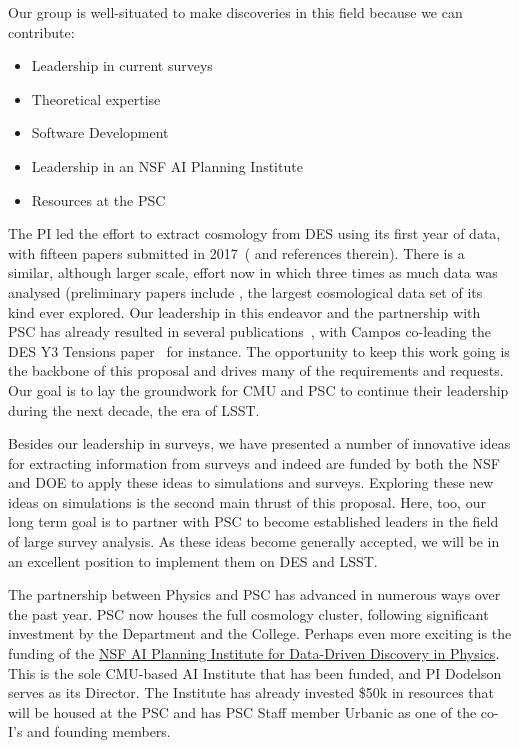 \documentclass[12pt]{article}
\begin{document}
\begin{small}
Our group is well-situated to make discoveries in this field because we can contribute:
\begin{itemize}
\item Leadership in current surveys
\item Theoretical expertise
\item Software Development
\item Leadership in an NSF AI Planning Institute
\item Resources at the PSC
\end{itemize} 
The PI led the effort to extract cosmology from DES using its first year of data, with fifteen papers submitted in 2017~(\cite{Abbott:2017wau} and references therein). There is a similar, although larger scale, effort now in which three times as much data was analysed (preliminary papers include , the largest cosmological data set of its kind ever explored. Our leadership in this endeavor and the partnership with PSC has already resulted in several publications~\cite{Hartley:2020euq,Lemos:2020jry,MacCrann:2020yhw,Friedrich:2020dqo,Myles:2020dyq}, with Campos co-leading the DES Y3 Tensions paper~\cite{y3-tensions} for instance. The opportunity to keep this work going is the backbone of this proposal and drives many of the requirements and requests. %
Our goal is to lay the groundwork for CMU and PSC to continue their leadership during the next decade, the era of LSST.

Besides our leadership in surveys, we have presented a number of innovative ideas for extracting information from surveys and indeed are funded by both the NSF and DOE to apply these ideas to simulations and surveys. Exploring these new ideas on simulations is the second main thrust of this proposal. Here, too, our long term goal is to partner with PSC to become established leaders in the field of large survey analysis. As these ideas become generally accepted, we will be in an excellent position to implement them on DES and LSST. 

The partnership between Physics and PSC has advanced in numerous ways over the past year. PSC now houses the full cosmology cluster, following significant investment by the Department and the College. Perhaps even more exciting is the funding of the \href{https://www.cmu.edu/ai-physics-institute/}{NSF AI Planning Institute for Data-Driven Discovery in Physics}. This is the sole CMU-based AI Institute that has been funded, and PI Dodelson serves as its Director. The Institute has already invested \$50k in resources that will be housed at the PSC and has PSC Staff member Urbanic as one of the co-I's and founding members. 


\end{small}
\end{document}
